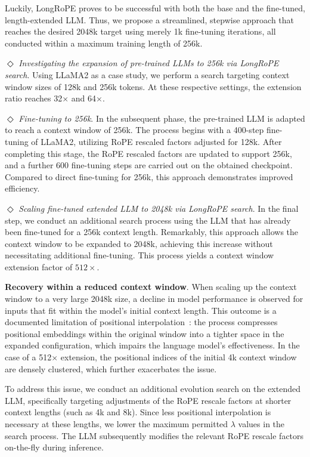 Luckily, LongRoPE proves to be successful with both the base and the fine-tuned, length-extended LLM. Thus, we propose a streamlined, stepwise approach that reaches the desired 2048k target using merely 1k fine-tuning iterations, all conducted within a maximum training length of 256k.

$\Diamond$ \textit{Investigating the expansion of pre-trained LLMs to 256k via LongRoPE search}. Using LLaMA2 as a case study, we perform a search targeting context window sizes of 128k and 256k tokens. At these respective settings, the extension ratio reaches 32$\times$ and 64$\times$.

$\Diamond$ \textit{Fine-tuning to 256k}. In the subsequent phase, the pre-trained LLM is adapted to reach a context window of 256k. The process begins with a 400-step fine-tuning of LLaMA2, utilizing RoPE rescaled factors adjusted for 128k. After completing this stage, the RoPE rescaled factors are updated to support 256k, and a further 600 fine-tuning steps are carried out on the obtained checkpoint. Compared to direct fine-tuning for 256k, this approach demonstrates improved efficiency.

$\Diamond$ \textit{Scaling fine-tuned extended LLM to 2048k via LongRoPE search}. In the final step, we conduct an additional search process using the LLM that has already been fine-tuned for a 256k context length. Remarkably, this approach allows the context window to be expanded to 2048k, achieving this increase without necessitating additional fine-tuning. This process yields a context window extension factor of $512\times$.

\textbf{Recovery within a reduced context window}. When scaling up the context window to a very large 2048k size, a decline in model performance is observed for inputs that fit within the model’s initial context length. This outcome is a documented limitation of positional interpolation~\cite{pi}: the process compresses positional embeddings within the original window into a tighter space in the expanded configuration, which impairs the language model’s effectiveness. In the case of a 512$\times$ extension, the positional indices of the initial 4k context window are densely clustered, which further exacerbates the issue.

To address this issue, we conduct an additional evolution search on the extended LLM, specifically targeting adjustments of the RoPE rescale factors at shorter context lengths (such as 4k and 8k). Since less positional interpolation is necessary at these lengths, we lower the maximum permitted $\lambda$ values in the search process. The LLM subsequently modifies the relevant RoPE rescale factors on-the-fly during inference.


